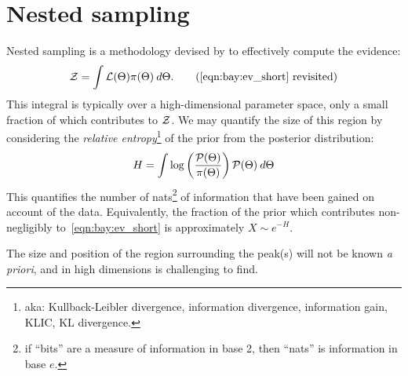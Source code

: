 \section{Nested sampling}
\label{sec:bay:nested_sampling}
%
Nested sampling is a methodology devised by \citet{skilling2006} to effectively compute the evidence:
\begin{equation}
  \ev = \int \lik(\params) \prior(\params) \: d\params.
  \tag{\ref{eqn:bay:ev_short} revisited}
\end{equation}
This integral is typically over a high-dimensional parameter space, only a small fraction of which contributes to $\mathcal{Z}$. We may quantify the size of this region by considering the {\em relative entropy\/}\footnote{aka: Kullback-Leibler divergence, information divergence, information gain, KLIC, KL divergence.} of the prior from the posterior distribution:
\begin{equation}
  H = \int \log\left( \frac{\mathcal{P}(\Theta)}{\pi(\Theta)}\right) \mathcal{P}(\Theta)\: d\Theta
  \label{eqn:bay:rel_ent}
\end{equation}  
This quantifies the number of nats\footnote{if ``bits'' are a measure of information in base 2, then ``nats'' is information in base $e$.} of information that have been gained on account of the data. Equivalently, the fraction of the prior which contributes non-negligibly to~\eqref{eqn:bay:ev_short} is approximately $X\sim e^{-H}$.

The size and position of the region surrounding the peak(s) will not be known {\em a priori}, and in high dimensions is challenging to find.  

